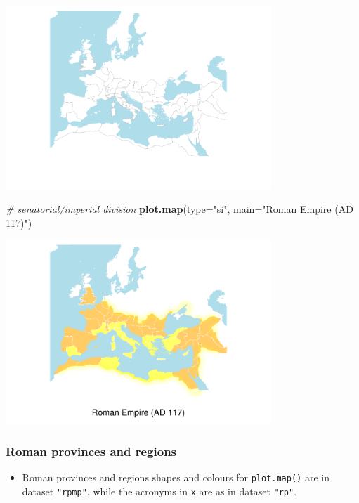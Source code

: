 \documentclass[a4paper,11pt]{memoir}
\newenvironment{Shaded}{\begin{snugshade}}{\end{snugshade}}
\newcommand{\CommentTok}[1]{\textcolor[rgb]{0.56,0.35,0.01}{\textit{#1}}}
\newcommand{\DataTypeTok}[1]{\textcolor[rgb]{0.13,0.29,0.53}{#1}}
\newcommand{\KeywordTok}[1]{\textcolor[rgb]{0.13,0.29,0.53}{\textbf{#1}}}
\newcommand{\NormalTok}[1]{#1}
\newcommand{\StringTok}[1]{\textcolor[rgb]{0.31,0.60,0.02}{#1}}
\providecommand{\tightlist}{%
  \setlength{\itemsep}{0pt}\setlength{\parskip}{0pt}}
\begin{document}
{\centering
\includegraphics[width=10cm, trim=0 0 0 0, clip]{img/unnamed-chunk-3-1_} 
}

\begin{Shaded}
\begin{Highlighting}[]
\CommentTok{# senatorial/imperial division}
\KeywordTok{plot.map}\NormalTok{(}\DataTypeTok{type=}\StringTok{"si"}\NormalTok{, }\DataTypeTok{main=}\StringTok{"Roman Empire (AD 117)"}\NormalTok{)}
\end{Highlighting}
\end{Shaded}

{\centering
\includegraphics[width=10cm, trim=0 0 0 0, clip]{img/unnamed-chunk-4-1} 
}

\bigbreak
\bigbreak

\hypertarget{roman-provinces-and-regions}{%
\subsubsection{Roman provinces and
regions}\label{roman-provinces-and-regions}}

\begin{itemize}
\tightlist
\item
  Roman provinces and regions shapes and colours for \texttt{plot.map()}
  are in dataset \texttt{"rpmp"}, while the acronyms in \texttt{x} are
  as in dataset \texttt{"rp"}.
\end{itemize}
\end{document}
